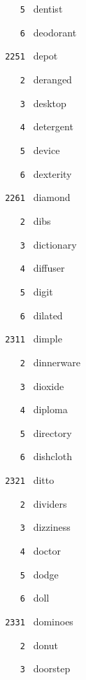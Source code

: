 \documentclass[11pt]{article}
\begin{document}
\begin{multicols}{6}
\noindent \texttt{ \ \ \ 5 } dentist  \par
\noindent \texttt{ \ \ \ 6 } deodorant  \par
\vspace{3mm}
\noindent \texttt{ 2251 } depot  \par
\noindent \texttt{ \ \ \ 2 } deranged  \par
\noindent \texttt{ \ \ \ 3 } desktop  \par
\noindent \texttt{ \ \ \ 4 } detergent  \par
\noindent \texttt{ \ \ \ 5 } device  \par
\noindent \texttt{ \ \ \ 6 } dexterity  \par
\vspace{3mm}
\noindent \texttt{ 2261 } diamond  \par
\noindent \texttt{ \ \ \ 2 } dibs  \par
\noindent \texttt{ \ \ \ 3 } dictionary  \par
\noindent \texttt{ \ \ \ 4 } diffuser  \par
\noindent \texttt{ \ \ \ 5 } digit  \par
\noindent \texttt{ \ \ \ 6 } dilated  \par
\noindent \texttt{ 2311 } dimple  \par
\noindent \texttt{ \ \ \ 2 } dinnerware  \par
\noindent \texttt{ \ \ \ 3 } dioxide  \par
\noindent \texttt{ \ \ \ 4 } diploma  \par
\noindent \texttt{ \ \ \ 5 } directory  \par
\noindent \texttt{ \ \ \ 6 } dishcloth  \par
\vspace{3mm}
\noindent \texttt{ 2321 } ditto  \par
\noindent \texttt{ \ \ \ 2 } dividers  \par
\noindent \texttt{ \ \ \ 3 } dizziness  \par
\noindent \texttt{ \ \ \ 4 } doctor  \par
\noindent \texttt{ \ \ \ 5 } dodge  \par
\noindent \texttt{ \ \ \ 6 } doll  \par
\vspace{3mm}
\noindent \texttt{ 2331 } dominoes  \par
\noindent \texttt{ \ \ \ 2 } donut  \par
\noindent \texttt{ \ \ \ 3 } doorstep  \par

\end{multicols}
\end{document}
